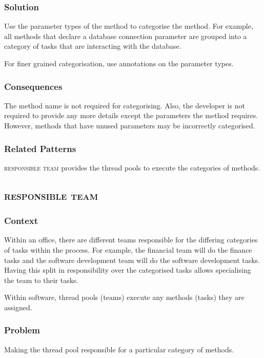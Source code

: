 \documentclass[prodmode]{style/acmlarge}
\begin{document}
\subsubsection*{\textbf{Solution}} Use the parameter types of the method to categorise
the method.  For example, all methods that declare a database connection
parameter are grouped into a category of tasks that are interacting with the
database.

For finer grained categorisation, use annotations on the parameter types.

\subsubsection*{Consequences} The method name is not required for categorising.
Also, the developer is not required to provide any more details except the
parameters the method requires.  However, methods that have unused parameters
may be incorrectly categorised.

\subsubsection*{Related Patterns} \textsc{responsible team} provides the thread
pools to execute the categories of methods.



\subsection{\textsc{\textbf{responsible team}}}

\subsubsection*{Context} Within an office, there are different teams responsible
for the differing categories of tasks within the process.  For example, the
financial team will do the finance tasks and the software development team will
do the software development tasks.  Having this split in responsibility over the
categorised tasks allows specialising the team to their tasks.

Within software, thread pools (teams) execute any methods (tasks) they are
assigned.

\subsubsection*{\textbf{Problem}} Making the thread pool responsible for a particular
category of methods.
\end{document}
